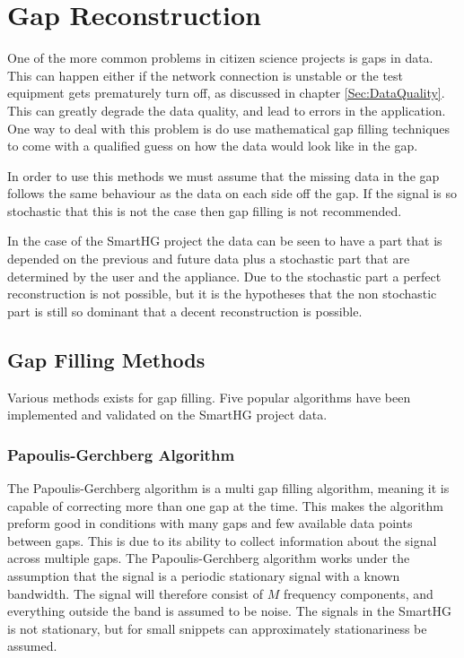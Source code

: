 \chapter{Gap Reconstruction}
One of the more common problems in citizen science projects is gaps in data. This can happen either if the network connection is unstable or the test equipment gets prematurely turn off, as discussed in chapter \ref{Sec:DataQuality}. This can greatly degrade the data quality, and lead to errors in the application. One way to deal with this problem is do use mathematical gap filling techniques to come with a qualified guess on how the data would look like in the gap. 

In order to use this methods we must assume that the missing data in the gap follows the same behaviour as the data on each side off the gap. If the signal is so stochastic that this is not the case then gap filling is not recommended\citep{RefWorks:10}. 

In the case of the SmartHG project the data can be seen to have a part that is depended on the previous and future data plus a stochastic part that are determined by the user and the appliance. Due to the stochastic part a perfect reconstruction is not possible, but it is the hypotheses that the non stochastic part is still so dominant that a decent reconstruction is possible. 

\section{Gap Filling Methods}
Various methods exists for gap filling. Five popular algorithms have been implemented and validated on the SmartHG project data.

\subsection{Papoulis-Gerchberg Algorithm}
\label{T:PGA}
The Papoulis-Gerchberg algorithm is a multi gap filling algorithm, meaning it is capable of correcting more than one gap at the time. This makes the algorithm preform good in conditions with many gaps and few available data points between gaps. This is due to its ability to collect information about the signal across multiple gaps\citep{RefWorks:11}. The Papoulis-Gerchberg algorithm works under the assumption that the signal is a periodic stationary signal with a known bandwidth. The signal will therefore consist of $M$ frequency components, and everything outside the band is assumed to be noise. The signals in the SmartHG is not stationary, but for small snippets can approximately stationariness be assumed. 

